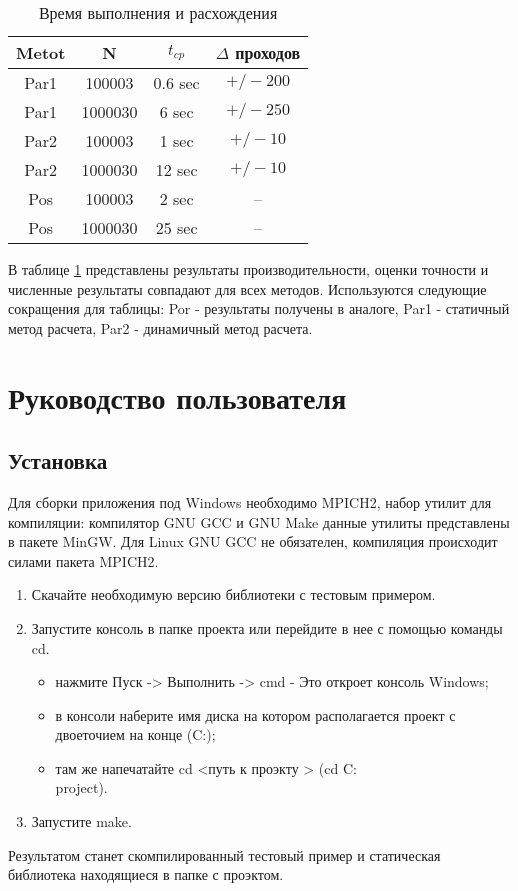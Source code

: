 \begin{table}[hp]
	\caption{Время выполнения и расхождения}
	\label{sample_table}
\begin{tabular}{|c|c|c|c|}
\hline 
Metot & N & $t_{cp}$ & $\Delta$ проходов \\ \hline
Par1 & 100003 & 0.6 sec & $+/- 200 $ \\ \hline
Par1 & 1000030 & 6 sec & $+/- 250 $ \\ \hline
Par2 & 100003 & 1 sec & $+/- 10 $ \\ \hline
Par2 & 1000030 & 12 sec & $+/- 10 $ \\ \hline
Pos & 100003 & 2 sec & -- \\ \hline
Pos & 1000030 & 25 sec & -- \\ \hline
\end{tabular}
\end{table}

В таблице \ref{sample_table} представлены результаты производительности, оценки точности и численные результаты совпадают для всех методов. Используются следующие сокращения для таблицы: Por - результаты получены в аналоге, Par1 - статичный метод расчета, Par2 - динамичный метод расчета.
\chapter{Руководство пользователя}
\section{Установка}
Для сборки приложения под Windows необходимо MPICH2, набор утилит для компиляции: компилятор GNU GCC и GNU Make данные утилиты представлены в пакете MinGW. Для Linux GNU GCC не обязателен, компиляция происходит силами пакета MPICH2.
\begin{enumerate}
	\item Скачайте необходимую версию библиотеки с тестовым примером.
	\item Запустите консоль в папке проекта или перейдите в нее с помощью команды cd.
	\begin{itemize}
		\item нажмите Пуск -> Выполнить -> cmd - Это откроет консоль Windows;
		\item в консоли наберите имя диска на котором располагается проект с двоеточием на конце (C:);
		\item там же напечатайте cd <путь к проэкту > (cd C:\\project).
	\end{itemize}
	\item Запустите make.
\end{enumerate}
Результатом станет скомпилированный тестовый пример и статическая библиотека находящиеся в папке с проэктом.

